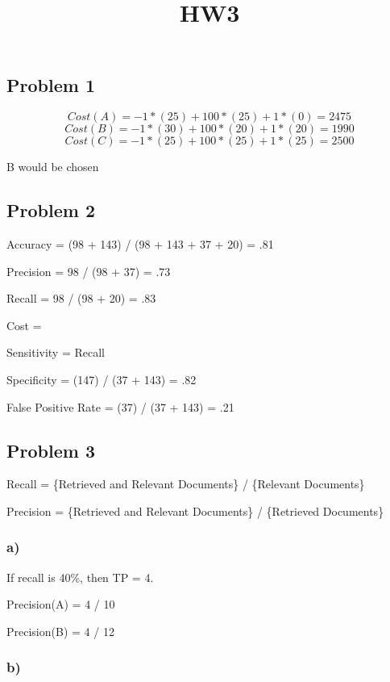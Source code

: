 \documentclass[11pt]{article}
\title{HW3}
\begin{document}
    
    
    \maketitle
    
    

    
    \subsection{Problem 1}\label{problem-1}

\[ Cost(A) = -1 * (25) + 100 * (25) + 1 * (0) = 2475 \]
\[ Cost(B) = -1 * (30) + 100 * (20) + 1 * (20) = 1990 \]
\[ Cost(C) = -1 * (25) + 100 * (25) + 1 * (25) = 2500 \]

B would be chosen

    \subsection{Problem 2}\label{problem-2}

Accuracy = (98 + 143) / (98 + 143 + 37 + 20) = .81

Precision = 98 / (98 + 37) = .73

Recall = 98 / (98 + 20) = .83

Cost =

Sensitivity = Recall

Specificity = (147) / (37 + 143) = .82

False Positive Rate = (37) / (37 + 143) = .21

    \subsection{Problem 3}\label{problem-3}

Recall = \{Retrieved and Relevant Documents\} / \{Relevant Documents\}

Precision = \{Retrieved and Relevant Documents\} / \{Retrieved
Documents\}

\subsubsection{a)}\label{a}

If recall is 40\%, then TP = 4.

Precision(A) = 4 / 10

Precision(B) = 4 / 12

\subsubsection{b)}\label{b}
\end{document}
